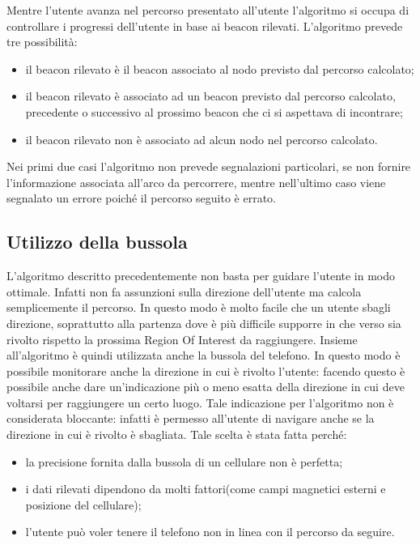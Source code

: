 \documentclass[../SperimentazioniPratiche.tex]{subfiles}
\begin{document}
		Mentre l'utente avanza nel percorso presentato all'utente l'algoritmo si occupa di controllare i progressi dell'utente in base ai beacon rilevati. L'algoritmo prevede tre possibilità:
		\begin{itemize}
			\item il beacon rilevato è il beacon associato al nodo previsto dal percorso calcolato;
			\item il beacon rilevato è associato ad un beacon previsto dal percorso calcolato, precedente o successivo al prossimo beacon che ci si aspettava di incontrare;
			\item il beacon rilevato non è associato ad alcun nodo nel percorso calcolato.
		\end{itemize}
		Nei primi due casi l'algoritmo non prevede segnalazioni particolari, se non fornire l'informazione associata all'arco da percorrere, mentre nell'ultimo caso viene segnalato un errore poiché il percorso seguito è errato.

	\subsection{Utilizzo della bussola}
		L'algoritmo descritto precedentemente non basta per guidare l'utente in modo ottimale. Infatti non fa assunzioni sulla direzione dell'utente ma calcola semplicemente il percorso. In questo modo è molto facile che un utente sbagli direzione, soprattutto alla partenza dove è più difficile supporre in che verso sia rivolto rispetto la prossima Region Of Interest da raggiungere. Insieme all'algoritmo è quindi utilizzata anche la bussola del telefono. In questo modo è possibile monitorare anche la direzione in cui è rivolto l'utente: facendo questo è possibile anche dare un'indicazione più o meno esatta della direzione in cui deve voltarsi per raggiungere un certo luogo. Tale indicazione per l'algoritmo non è considerata bloccante: infatti è permesso all'utente di navigare anche se la direzione in cui è rivolto è sbagliata. Tale scelta è stata fatta perché:
		\begin{itemize}
			\item la precisione fornita dalla bussola di un cellulare non è perfetta;
			\item i dati rilevati dipendono da molti fattori(come campi magnetici esterni e posizione del cellulare);
			\item l'utente può voler tenere il telefono non in linea con il percorso da seguire.
		\end{itemize}
		
\end{document}
